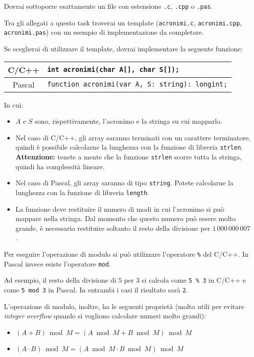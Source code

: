 \Implementation
Dovrai sottoporre esattamente un file con estensione \texttt{.c}, \texttt{.cpp} o \texttt{.pas}.

\begin{warning}
Tra gli allegati a questo task troverai un template (\texttt{acronimi.c}, \texttt{acronimi.cpp}, \texttt{acronimi.pas}) con un esempio di implementazione da completare.
\end{warning}

Se sceglierai di utilizzare il template, dovrai implementare la seguente funzione:
\begin{center}\begin{tabularx}{\textwidth}{|c|X|}
\hline
C/C++  & \verb|int acronimi(char A[], char S[]);|\\
\hline
Pascal & \verb|function acronimi(var A, S: string): longint;|\\
\hline
\end{tabularx}\end{center}
In cui:
\begin{itemize}[nolistsep]
  \item $A$ e $S$ sono, rispettivamente, l'acronimo e la stringa su cui mapparlo.
  \item Nel caso di C/C++, gli array saranno terminati con un carattere terminatore, quindi è possibile calcolarne la lunghezza con la funzione di libreria \texttt{strlen}. \textbf{Attenzione:} tenete a mente che la funzione \texttt{strlen} scorre tutta la stringa, quindi ha complessità lineare.
  \item Nel caso di Pascal, gli array saranno di tipo \texttt{string}. Potete calcolarne la lunghezza con la funzione di libreria \texttt{length}.
  \item La funzione deve restituire il numero di modi in cui l'acronimo si può mappare nella stringa. Dal momento che questo numero può essere molto grande, è necessario restituire soltanto il resto della divisione per $1\,000\,000\,007$.
\end{itemize}

\begin{warning}
  Per eseguire l'operazione di modulo si può utilizzare l'operatore \texttt{\%} del C/C++. In Pascal invece esiste l'operatore \texttt{mod}.

  Ad esempio, il resto della divisione di $5$ per $3$ si calcola come \texttt{5 \% 3} in C/C++ e come \texttt{5 mod 3} in Pascal. In entrambi i casi il risultato sarà \texttt{2}.

  L'operazione di modulo, inoltre, ha le seguenti proprietà (molto utili per evitare \emph{integer overflow} quando si vogliono calcolare numeri molto grandi):
  \begin{itemize}[nolistsep]
    \item $(A + B) \bmod M = (A \bmod M + B \bmod M) \bmod M$
    \item $(A \cdot B) \bmod M = (A \bmod M \cdot B \bmod M) \bmod M$
  \end{itemize}
\end{warning}

